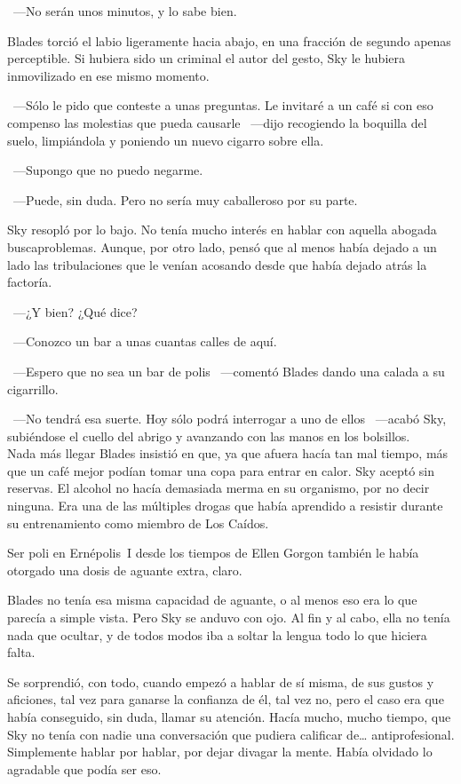 ~---No serán unos minutos, y lo sabe bien.

Blades torció el labio ligeramente hacia abajo, en una fracción de segundo apenas perceptible. Si hubiera sido un criminal el autor del gesto, Sky le hubiera inmovilizado en ese mismo momento.

~---Sólo le pido que conteste a unas preguntas. Le invitaré a un café si con eso compenso las molestias que pueda causarle ~---dijo recogiendo la boquilla del suelo, limpiándola y poniendo un nuevo cigarro sobre ella.

~---Supongo que no puedo negarme.

~---Puede, sin duda. Pero no sería muy caballeroso por su parte.

Sky resopló por lo bajo. No tenía mucho interés en hablar con aquella abogada buscaproblemas. Aunque, por otro lado, pensó que al menos había dejado a un lado las tribulaciones que le venían acosando desde que había dejado atrás la factoría.

~---¿Y bien? ¿Qué dice?

~---Conozco un bar a unas cuantas calles de aquí.

~---Espero que no sea un bar de polis ~---comentó Blades dando una calada a su cigarrillo.

~---No tendrá esa suerte. Hoy sólo podrá interrogar a uno de ellos ~---acabó Sky, subiéndose el cuello del abrigo y avanzando con las manos en los bolsillos.\\

\noindent{}Nada más llegar Blades insistió en que, ya que afuera hacía tan mal tiempo, más que un café mejor podían tomar una copa para entrar en calor. Sky aceptó sin reservas. El alcohol no hacía demasiada merma en su organismo, por no decir ninguna. Era una de las múltiples drogas que había aprendido a resistir durante su entrenamiento como miembro de Los Caídos.

Ser poli en Ernépolis~I desde los tiempos de Ellen Gorgon también le había otorgado una dosis de aguante extra, claro.

Blades no tenía esa misma capacidad de aguante, o al menos eso era lo que parecía a simple vista. Pero Sky se anduvo con ojo. Al fin y al cabo, ella no tenía nada que ocultar, y de todos modos iba a soltar la lengua todo lo que hiciera falta.

Se sorprendió, con todo, cuando empezó a hablar de sí misma, de sus gustos y aficiones, tal vez para ganarse la confianza de él, tal vez no, pero el caso era que había conseguido, sin duda, llamar su atención. Hacía mucho, mucho tiempo, que Sky no tenía con nadie una conversación que pudiera calificar de\dots{} antiprofesional. Simplemente hablar por hablar, por dejar divagar la mente. Había olvidado lo agradable que podía ser eso.

